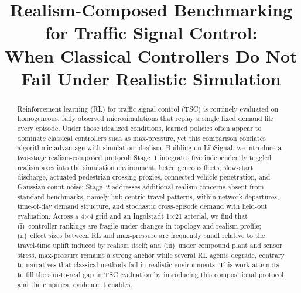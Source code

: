 \documentclass[conference]{IEEEtran}
\begin{document}
\title{Realism-Composed Benchmarking for Traffic Signal Control:\\ When Classical Controllers Do Not Fail Under Realistic Simulation}

\author{
\and
{}
\and
{}
}

\maketitle

\begin{abstract}
Reinforcement learning (RL) for traffic signal control (TSC) is routinely evaluated on homogeneous, fully observed microsimulations that replay a single fixed demand file every episode. Under those idealized conditions, learned policies often appear to dominate classical controllers such as max-pressure, yet this comparison conflates algorithmic advantage with simulation idealism. Building on LibSignal, we introduce a two-stage realism-composed protocol: Stage~1 integrates five independently toggled realism axes into the simulation environment, heterogeneous fleets, slow-start discharge, actuated pedestrian crossing proxies, connected-vehicle penetration, and Gaussian count noise; Stage~2 addresses additional realism concerns absent from standard benchmarks, namely hub-centric travel patterns, within-network departures, time-of-day demand structure, and stochastic cross-episode demand with held-out evaluation. Across a 4$\times$4 grid and an Ingolstadt 1$\times$21 arterial, we find that (i)~controller rankings are fragile under changes in topology and realism profile; (ii)~effect sizes between RL and max-pressure are frequently small relative to the travel-time uplift induced by realism itself; and (iii)~under compound plant and sensor stress, max-pressure remains a strong anchor while several RL agents degrade, contrary to narratives that classical methods fail in realistic environments. This work attempts to fill the sim-to-real gap in TSC evaluation by introducing this compositional protocol and the empirical evidence it enables.
\end{abstract}
\end{document}

